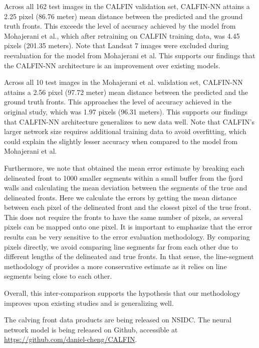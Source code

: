 \documentclass[tc, manuscript]{copernicus}
\begin{document}
Across all 162 test images in the CALFIN validation set, CALFIN-NN attains a 2.25 pixel (86.76 meter) mean distance between the predicted and the ground truth fronts. This exceeds the level of accuracy achieved by the model from Mohajerani et al., which after retraining on CALFIN training data, was 4.45 pixels (201.35 meters). Note that Landsat 7 images were excluded during reevaluation for the model from Mohajerani et al. This supports our findings that the CALFIN-NN architecture is an improvement over existing models.

Across all 10 test images in the Mohajerani et al. validation set, CALFIN-NN attains a 2.56 pixel (97.72 meter) mean distance between the predicted and the ground truth fronts. This approaches the level of accuracy achieved in the original study, which was 1.97 pixels (96.31 meters). This supports our findings that CALFIN-NN architecture generalizes to new data well. Note that CALFIN's larger network size requires additional training data to avoid overfitting, which could explain the slightly lesser accuracy when compared to the model from Mohajerani et al.

Furthermore, we note that \citep{mohajerani2019} obtained the mean error estimate by breaking each delineated front to 1000 smaller segments within a small buffer from the fjord walls and calculating the mean deviation between the segments of the true and delineated fronts. Here we calculate the errors by getting the mean distance between each pixel of the delineated front and the closest pixel of the true front. This does not require the fronts to have the same number of pixels, as several pixels can be mapped onto one pixel. It is important to emphasize that the error results can be very sensitive to the error evaluation methodology. By comparing pixels directly, we avoid comparing line segments far from each other due to different lengths of the delineated and true fronts. In that sense, the line-segment methodology of \citep{mohajerani2019} provides a more conservative estimate as it relies on line segments being close to each other.

Overall, this inter-comparison supports the hypothesis that our methodology improves upon existing studies and is generalizing well.

\label{sec:conclusion}
The calving front data products are being released on NSIDC. %
The neural network model is being released on Github, accessible at \url{https://github.com/daniel-cheng/CALFIN}.
\end{document}
